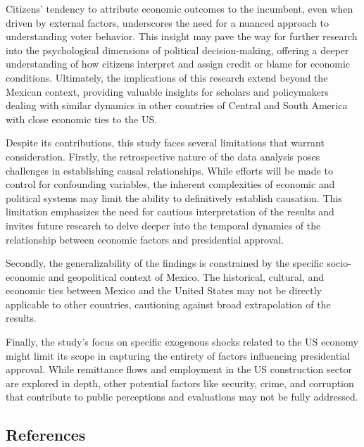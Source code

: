 \documentclass[
]{article}
\begin{document}
Citizens' tendency to attribute economic outcomes to the incumbent, even
when driven by external factors, underscores the need for a nuanced
approach to understanding voter behavior. This insight may pave the way
for further research into the psychological dimensions of political
decision-making, offering a deeper understanding of how citizens
interpret and assign credit or blame for economic conditions.
Ultimately, the implications of this research extend beyond the Mexican
context, providing valuable insights for scholars and policymakers
dealing with similar dynamics in other countries of Central and South
America with close economic ties to the US.

Despite its contributions, this study faces several limitations that
warrant consideration. Firstly, the retrospective nature of the data
analysis poses challenges in establishing causal relationships. While
efforts will be made to control for confounding variables, the inherent
complexities of economic and political systems may limit the ability to
definitively establish causation. This limitation emphasizes the need
for cautious interpretation of the results and invites future research
to delve deeper into the temporal dynamics of the relationship between
economic factors and presidential approval.

Secondly, the generalizability of the findings is constrained by the
specific socio-economic and geopolitical context of Mexico. The
historical, cultural, and economic ties between Mexico and the United
States may not be directly applicable to other countries, cautioning
against broad extrapolation of the results.

Finally, the study's focus on specific exogenous shocks related to the
US economy might limit its scope in capturing the entirety of factors
influencing presidential approval. While remittance flows and employment
in the US construction sector are explored in depth, other potential
factors like security, crime, and corruption that contribute to public
perceptions and evaluations may not be fully addressed.

\singlespacing

\hypertarget{references}{%
\subsection{References}\label{references}}
\end{document}
